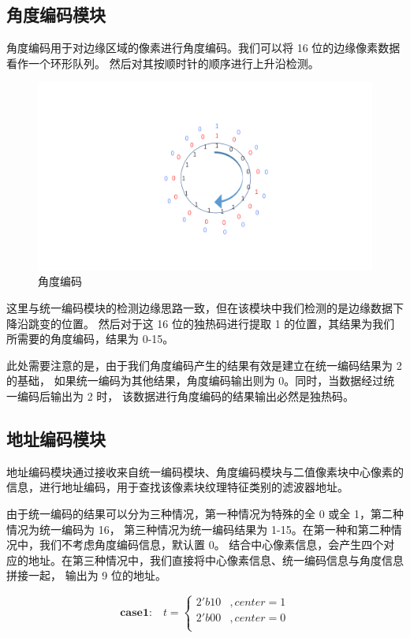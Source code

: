 \documentclass[12pt, a4paper, oneside]{ctexbook}
\begin{document}
	\subsection{角度编码模块}
	角度编码用于对边缘区域的像素进行角度编码。我们可以将 16 位的边缘像素数据看作一个环形队列。
	然后对其按顺时针的顺序进行上升沿检测。
		\begin{figure}[h]	
		\centering
		\includegraphics[scale=0.5]{pic/angle.pdf}
		\caption{角度编码}
		\end{figure}
	\par 这里与统一编码模块的检测边缘思路一致，但在该模块中我们检测的是边缘数据下降沿跳变的位置。
	然后对于这 16 位的独热码进行提取 1 的位置，其结果为我们所需要的角度编码，结果为 0-15。
	\par 此处需要注意的是，由于我们角度编码产生的结果有效是建立在统一编码结果为 2 的基础，
	如果统一编码为其他结果，角度编码输出则为 0。同时，当数据经过统一编码后输出为 2 时，
	该数据进行角度编码的结果输出必然是独热码。
	\subsection{地址编码模块}
	地址编码模块通过接收来自统一编码模块、角度编码模块与二值像素块中心像素的信息，进行地址编码，用于查找该像素块纹理特征类别的滤波器地址。
	\par 由于统一编码的结果可以分为三种情况，第一种情况为特殊的全 0 或全 1，第二种情况为统一编码为 16，
	第三种情况为统一编码结果为 1-15。在第一种和第二种情况中，我们不考虑角度编码信息，默认置 0。
	结合中心像素信息，会产生四个对应的地址。在第三种情况中，我们直接将中心像素信息、统一编码信息与角度信息拼接一起，
	输出为 9 位的地址。

	$$
	\textbf{case1:} \quad t=
		\begin{cases}
			2'b10 &,center = 1 \\
			2'b00 &,center = 0 \\
		\end{cases}
	$$
\end{document}
